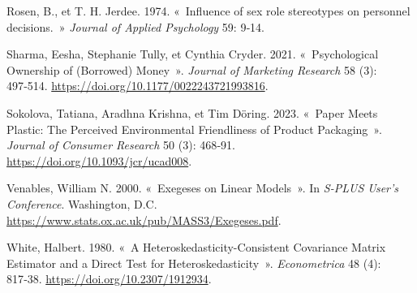 \documentclass[
  11pt,
  letterpaper,
]{scrbook}
\newlength{\cslhangindent}
\newenvironment{CSLReferences}[2] %
 {\begin{list}{}{%
  \setlength{\itemindent}{0pt}
  \setlength{\leftmargin}{0pt}
  \setlength{\parsep}{0pt}
  \ifodd #1
   \setlength{\leftmargin}{\cslhangindent}
   \setlength{\itemindent}{-1\cslhangindent}
  \fi
  \setlength{\itemsep}{#2\baselineskip}}}
 {\end{list}}
\theoremstyle{plain}
\theoremstyle{definition}
\theoremstyle{plain}
\theoremstyle{definition}
\theoremstyle{remark}
\begin{document}
\begin{CSLReferences}{1}{0}
Rosen, B., et T. H. Jerdee. 1974. {«~Influence of sex role stereotypes
on personnel decisions.~»} \emph{Journal of Applied Psychology} 59:
9‑14.

Sharma, Eesha, Stephanie Tully, et Cynthia Cryder. 2021.
{«~Psychological Ownership of (Borrowed) Money~»}. \emph{Journal of
Marketing Research} 58 (3): 497‑514.
\url{https://doi.org/10.1177/0022243721993816}.

Sokolova, Tatiana, Aradhna Krishna, et Tim Döring. 2023. {«~Paper Meets
Plastic: The Perceived Environmental Friendliness of Product
Packaging~»}. \emph{Journal of Consumer Research} 50 (3): 468‑91.
\url{https://doi.org/10.1093/jcr/ucad008}.

Venables, William N. 2000. {«~Exegeses on Linear Models~»}. In
\emph{S-PLUS User's Conference}. Washington, D.C.
\url{https://www.stats.ox.ac.uk/pub/MASS3/Exegeses.pdf}.

White, Halbert. 1980. {«~A Heteroskedasticity-Consistent Covariance
Matrix Estimator and a Direct Test for Heteroskedasticity~»}.
\emph{Econometrica} 48 (4): 817‑38.
\url{https://doi.org/10.2307/1912934}.

\end{CSLReferences}


\backmatter
\end{document}
